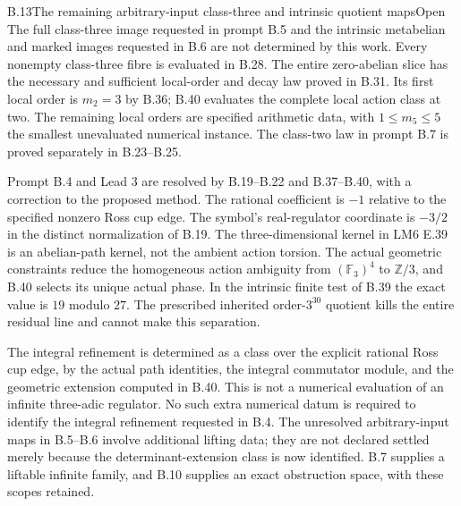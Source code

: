 \begin{statement}{B.13}{The remaining arbitrary-input class-three and intrinsic quotient maps}{Open}
The full class-three image requested in prompt B.5 and the
intrinsic metabelian and marked images requested in B.6 are
not determined by this work. Every nonempty class-three
fibre is evaluated in B.28. The entire zero-abelian slice
has the necessary and sufficient local-order and decay law
proved in B.31. Its first local order is $m_2=3$ by B.36;
B.40 evaluates the complete local action class at two.
The remaining local orders are specified arithmetic data,
with $1\le m_5\le5$ the smallest unevaluated numerical
instance. The class-two law in prompt B.7 is proved
separately in B.23--B.25.

Prompt B.4 and Lead 3 are resolved by B.19--B.22 and
B.37--B.40, with a correction to the proposed method.
The rational coefficient is $-1$ relative to the specified
nonzero Ross cup edge. The symbol's real-regulator coordinate
is $-3/2$ in the distinct normalization of B.19.
The three-dimensional kernel in LM6 E.39 is an abelian-path
kernel, not the ambient action torsion.
The actual geometric constraints reduce the homogeneous
action ambiguity from $(\mathbb F_3)^4$ to $\mathbb Z/3$,
and B.40 selects its unique actual phase. In the intrinsic
finite test of B.39 the exact value is $19$ modulo $27$.
The prescribed inherited order-$3^{30}$ quotient kills the
entire residual line and cannot make this separation.
\end{statement}
The integral refinement is determined as a class over the
explicit rational Ross cup edge, by the actual path identities,
the integral commutator module, and the geometric extension
computed in B.40. This is not a numerical evaluation of an
infinite three-adic regulator. No such extra numerical datum
is required to identify the integral refinement requested
in B.4. The unresolved arbitrary-input maps in B.5--B.6
involve additional lifting data; they are not declared
settled merely because the determinant-extension class is
now identified. B.7 supplies a liftable infinite family,
and B.10 supplies an exact obstruction space, with these
scopes retained.


